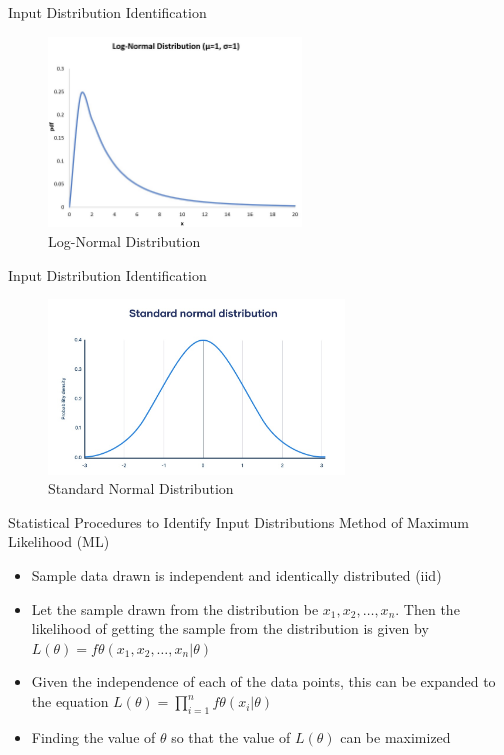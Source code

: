 \documentclass{beamer}
\begin{document}
    \begin{frame}{Input Distribution Identiﬁcation}
        \begin{figure}
            \centering
            \includegraphics[width=0.6\textwidth]{figures/log.jpeg}
            \caption{Log-Normal Distribution}
            \label{fig:log}
        \end{figure}
    \end{frame}

    \begin{frame}{Input Distribution Identiﬁcation}
        \begin{figure}
            \centering
            \includegraphics[width=0.7\textwidth]{figures/normal.jpg}
            \caption{Standard Normal Distribution}
            \label{fig:normal}
        \end{figure}
    \end{frame}

    \begin{frame}{Statistical Procedures to Identify Input Distributions}
        \vspace{1em}
        Method of Maximum Likelihood (ML)
        \begin{itemize}
            \item<1->[-] Sample data drawn is independent and identically distributed (iid)
            \item<2->[-] Let the sample drawn from the distribution be $x_1, x_2,\ldots, x_n$. Then the likelihood of getting the sample from the distribution is given by $L(\theta)=f\theta (x_1, x_2,\ldots, x_n |\theta)$
            \item<3->[-] Given the independence of each of the data points, this can  be expanded to the equation $L(\theta)=\prod_{i=1}^{n}f\theta(x_i|\theta)$
            \item<4->[-] Finding the value of $\theta$ so that the value of $L(\theta)$ can be maximized 
        \end{itemize}
    \end{frame}
\end{document}
